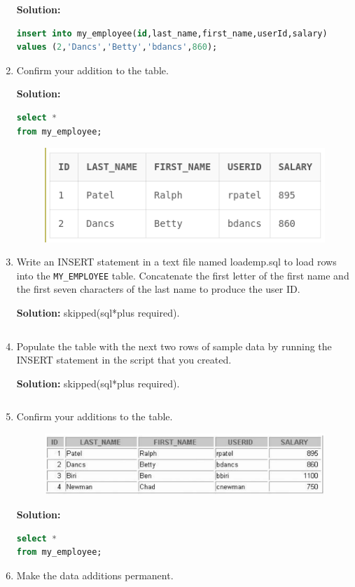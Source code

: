 \begin{enumerate}
    \textbf{Solution: }
    \begin{lstlisting}[language=SQL]
insert into my_employee(id,last_name,first_name,userId,salary)
values (2,'Dancs','Betty','bdancs',860);  
    \end{lstlisting}
    \item  Confirm your addition to the table.   
    
    \textbf{Solution: }
    \begin{lstlisting}[language=SQL]
select * 
from my_employee;
    \end{lstlisting}
\begin{figure}[h]
    \centering
    \includegraphics[width=0.7\linewidth]{graphics/p85.png}
\end{figure}
    \item  Write an INSERT statement in a text file named loademp.sql to load rows into the
\texttt{MY\_EMPLOYEE} table. Concatenate the first letter of the first name and the first seven characters of
the last name to produce the user ID.  
    
    \textbf{Solution: }skipped(sql*plus required).
    \begin{lstlisting}[language=SQL]
    \end{lstlisting}
    \item  Populate the table with the next two rows of sample data by running the INSERT statement in the
script that you created. 
    
    \textbf{Solution: }skipped(sql*plus required).
    \begin{lstlisting}[language=SQL]
    \end{lstlisting}
    \item  Confirm your additions to the table.
    \begin{figure}[h]
        \centering
        \includegraphics[width=0.9\linewidth]{graphics/88.png}
    \end{figure}
    \textbf{Solution: }
    \begin{lstlisting}[language=SQL]
select *
from my_employee;
    \end{lstlisting}
    \item  Make the data additions permanent.
    

\end{enumerate}

